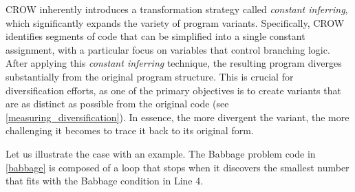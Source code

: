 
\label{CROW:constant_inferring}
CROW inherently introduces a transformation strategy called \emph{constant inferring}, which significantly expands the variety of \Wasm program variants. 
Specifically, CROW identifies segments of code that can be simplified into a single constant assignment, with a particular focus on variables that control branching logic. 
After applying this \emph{constant inferring} technique, the resulting program diverges substantially from the original program structure. 
This is crucial for diversification efforts, as one of the primary objectives is to create variants that are as distinct as possible from the original code (see \autoref{measuring_diversification}). 
In essence, the more divergent the variant, the more challenging it becomes to trace it back to its original form.




Let us illustrate the case with an example.
The Babbage problem code in \autoref{babbage} is composed of a loop that stops when it discovers the smallest number that fits with the Babbage condition in Line 4.


